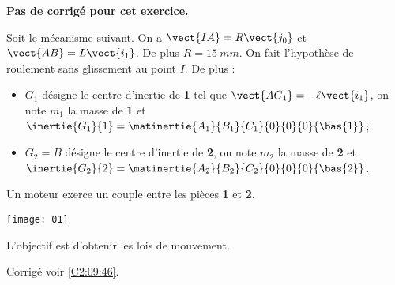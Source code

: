 \normalfalse \difficiletrue \tdifficilefalse
\correctionfalse


\setcounter{numques}{0}
\ifcorrection
\else
\textbf{Pas de corrigé pour cet exercice.}
\fi

\ifprof
\else
Soit le mécanisme suivant. On a $\vect{IA}=R\vect{j_0}$ et $\vect{AB}=L\vect{i_1}$. De plus $R=\SI{15}{mm}$.
On fait l'hypothèse de roulement sans glissement au point $I$. De plus :
\begin{itemize}
\item $G_1$ désigne le centre d'inertie de \textbf{1} tel que $\vect{AG_1}=-\ell\vect{i_1}$, on note $m_1$ la masse de \textbf{1} et $\inertie{G_1}{1}=\matinertie{A_1}{B_1}{C_1}{0}{0}{0}{\bas{1}}$; 
\item $G_2=B$ désigne le centre d'inertie de \textbf{2}, on note $m_2$ la masse de \textbf{2} et $\inertie{G_2}{2}=\matinertie{A_2}{B_2}{C_2}{0}{0}{0}{\bas{2}}$.
\end{itemize}
Un moteur exerce un couple entre les pièces \textbf{1} et \textbf{2}. 
\begin{center}
\texttt{[image: 01]}
\end{center}
\fi

L'objectif est d'obtenir les lois de mouvement. 

\ifprof
\else
\fi

\ifprof
\else
\fi


\ifprof
\else
\begin{flushright}
\footnotesize{Corrigé  voir \ref{C2:09:46}.}
\end{flushright}%
\fi